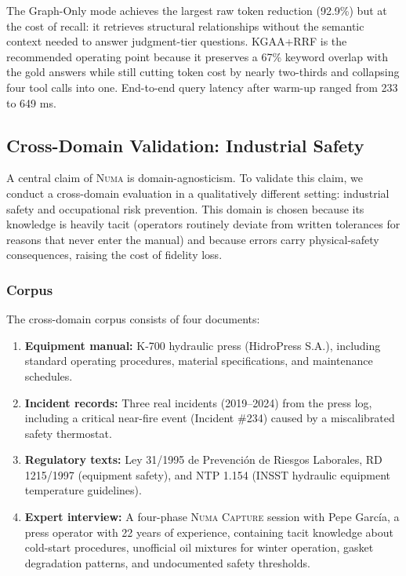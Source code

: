 \documentclass[11pt,a4paper]{article}
\begin{document}
The Graph-Only mode achieves the largest raw token reduction (92.9\%) but at the cost of recall: it retrieves structural relationships without the semantic context needed to answer judgment-tier questions. KGAA+RRF is the recommended operating point because it preserves a 67\% keyword overlap with the gold answers while still cutting token cost by nearly two-thirds and collapsing four tool calls into one. End-to-end query latency after warm-up ranged from 233 to 649 ms.

\subsection{Cross-Domain Validation: Industrial Safety}

A central claim of \textsc{Numa} is domain-agnosticism. To validate this claim, we conduct a cross-domain evaluation in a qualitatively different setting: industrial safety and occupational risk prevention. This domain is chosen because its knowledge is heavily tacit (operators routinely deviate from written tolerances for reasons that never enter the manual) and because errors carry physical-safety consequences, raising the cost of fidelity loss.

\subsubsection{Corpus}

The cross-domain corpus consists of four documents:

\begin{enumerate}
    \item \textbf{Equipment manual:} K-700 hydraulic press (HidroPress S.A.), including standard operating procedures, material specifications, and maintenance schedules.
    \item \textbf{Incident records:} Three real incidents (2019--2024) from the press log, including a critical near-fire event (Incident \#234) caused by a miscalibrated safety thermostat.
    \item \textbf{Regulatory texts:} Ley 31/1995 de Prevenci\'on de Riesgos Laborales, RD 1215/1997 (equipment safety), and NTP 1.154 (INSST hydraulic equipment temperature guidelines).
    \item \textbf{Expert interview:} A four-phase \textsc{Numa Capture} session with Pepe Garc\'ia, a press operator with 22 years of experience, containing tacit knowledge about cold-start procedures, unofficial oil mixtures for winter operation, gasket degradation patterns, and undocumented safety thresholds.
\end{enumerate}
\end{document}
